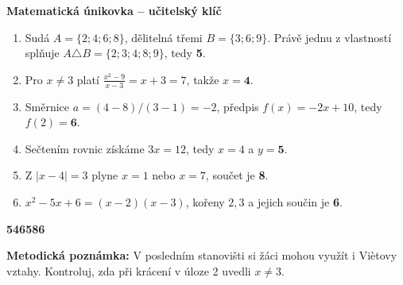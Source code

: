 \documentclass[11pt,a4paper]{article}
\begin{document}
\begin{center}{\Large\bfseries Matematická únikovka -- učitelský klíč}\end{center}
\begin{enumerate}[label=\arabic*.]
\item Sudá $A=\{2;4;6;8\}$, dělitelná třemi $B=\{3;6;9\}$. Právě jednu z vlastností splňuje $A\triangle B=\{2;3;4;8;9\}$, tedy \textbf{5}.
\item Pro $x\ne3$ platí $\frac{x^2-9}{x-3}=x+3=7$, takže $x=\textbf{4}$.
\item Směrnice $a=(4-8)/(3-1)=-2$, předpis $f(x)=-2x+10$, tedy $f(2)=\textbf{6}$.
\item Sečtením rovnic získáme $3x=12$, tedy $x=4$ a $y=\textbf{5}$.
\item Z $|x-4|=3$ plyne $x=1$ nebo $x=7$, součet je \textbf{8}.
\item $x^2-5x+6=(x-2)(x-3)$, kořeny $2,3$ a jejich součin je \textbf{6}.
\end{enumerate}
\bigskip\begin{center}{\Huge\bfseries 546586}\end{center}
\medskip
\textbf{Metodická poznámka:} V posledním stanovišti si žáci mohou využít i Viètovy vztahy. Kontroluj, zda při krácení v úloze 2 uvedli $x\ne3$.
\end{document}
